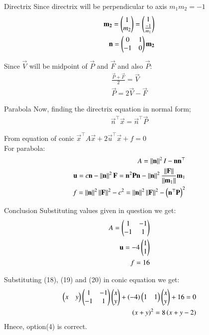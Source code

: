 \documentclass{beamer}
\begin{document}
\begin{frame}{Directrix}
Since directrix will be perpendicular to axis $m_1m_2=-1$
\begin{align}
    \mathbf{m_2} = \begin{pmatrix}1\\m_2\end{pmatrix} = \begin{pmatrix}1\\ \frac{-1}{m_1}\end{pmatrix}\\
    \mathbf{n} = \begin{pmatrix}0&1\\-1&0\end{pmatrix}\mathbf{m_2}
\end{align}

Since $\vec{V}$ will be midpoint of $\vec{P}$ and $\vec{F}$ and also $\vec{P}$:
\begin{align}
    \frac{\vec{P}+\vec{F}}{2} = \vec{V}\\
    \vec{P}=2\vec{V}-\vec{F}
\end{align}
\end{frame}

\begin{frame}{Parabola}
Now, finding the directrix equation in normal form;
\begin{align}
    \vec{n}^\top\vec{x}=\vec{n}^\top\vec{P}
\end{align}

From equation of conic $\vec{x}^\top A\vec{x}+2\vec{u}^\top\vec{x}+f=0$\\
For parabola:
\begin{align}
    A=\left\lVert\mathbf{n}\right\rVert^2I-\mathbf{n}\mathbf{n}^\top\\
    \mathbf{u}=c\mathbf{n}-\left\lVert\mathbf{n}\right\rVert^2\mathbf{F}=\mathbf{n}^2\mathbf{P}\mathbf{n}-\left\lVert\mathbf{n}\right\rVert^2\frac{\left\lVert\mathbf{F}\right\rVert}{\left\lVert\mathbf{m}_1\right\rVert}\mathbf{m}_1\\
    f=\left\lVert\mathbf{n}\right\rVert^2\left\lVert\mathbf{F}\right\rVert^2-c^2=\left\lVert\mathbf{n}\right\rVert^2\left\lVert\mathbf{F}\right\rVert^2-\left(\mathbf{n}^\top\mathbf{P}\right)^2
\end{align}

\end{frame}

\begin{frame}{Conclusion}
Substituting values given in question we get:
\begin{align}
    A=\begin{pmatrix}1&-1\\-1&1\end{pmatrix}\\
    \mathbf{u}=-4\begin{pmatrix}1\\1\end{pmatrix}\\
    f=16
\end{align}

Substituting (18), (19) and (20) in conic equation we get:
\begin{align}
    \begin{pmatrix}x&y\end{pmatrix}\begin{pmatrix}1&-1\\-1&1\end{pmatrix}\begin{pmatrix}x\\y\end{pmatrix}+\left(-4\right)\begin{pmatrix}1&1\end{pmatrix}\begin{pmatrix}x\\y\end{pmatrix}+16=0\\
    \left(x+y\right)^2=8\left(x+y-2\right)
\end{align}
Hnece, option(4) is correct.
\end{frame}
\end{document}
